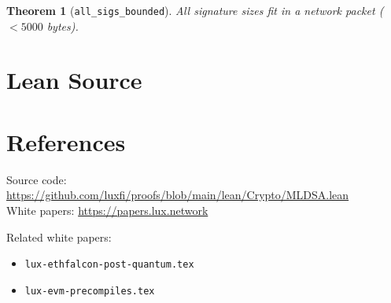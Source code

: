 \documentclass[11pt]{article}
\newtheorem{theorem}{Theorem}
\begin{document}
\begin{theorem}[\texttt{all\_sigs\_bounded}]
All signature sizes fit in a network packet ($< 5000$ bytes).
\end{theorem}


\section{Lean Source}


\section{References}
\noindent Source code: \url{https://github.com/luxfi/proofs/blob/main/lean/Crypto/MLDSA.lean}\\
\noindent White papers: \url{https://papers.lux.network}

\noindent Related white papers:
\begin{itemize}
  \item \texttt{lux-ethfalcon-post-quantum.tex}
  \item \texttt{lux-evm-precompiles.tex}
\end{itemize}
\end{document}
